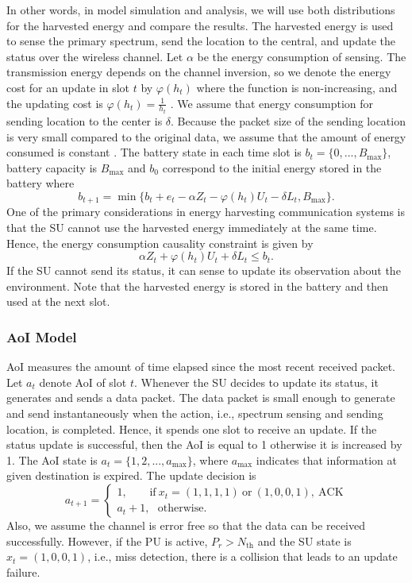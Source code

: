 \documentclass[journal]{IEEEtran}
\begin{document}
		In other words, in model simulation and analysis, we will use both distributions for the harvested energy and compare the results. The harvested energy is used to sense the primary spectrum, send the location to the central, and update the status over the wireless channel. Let $\alpha$ be the energy consumption of sensing. The transmission energy depends on the channel inversion, so we denote the energy cost for an update in slot $t$ by $\varphi ({h_t})$ where the function  is non-increasing, and the updating cost is $\varphi ({h_t}) = \frac{1}{{{h_t}}}$ \cite{Joint_24}. We assume that energy consumption for sending location to the center is $\delta$. Because the packet size of the sending location is very small compared to the original data, we assume that the amount of energy consumed is constant \cite{Joint_24}. The battery state in each time slot is $b_t = \{0,..., B_{\text{max}}\}$, battery capacity is $B_{\text{max}}$ and $b_0$ correspond to the initial energy stored in the battery where
		\begin{equation}
			b_{t + 1} = \min \{ {b_t} + {e_t} - \alpha {Z_t} - \varphi ({h_t}){U_t} - \delta {L_t},{B_{\max }}\}.
		\end{equation}
		One of the primary considerations in energy harvesting communication systems is that the SU cannot use the harvested energy immediately at the same time. Hence, the energy consumption causality constraint is given by
		\begin{equation}
			\alpha {Z_t} + \varphi ({h_t}){U_t} + \delta {L_t} \le {b_t}.
		\end{equation}
		If the SU cannot send its status, it can sense to update its observation about the environment. Note that the harvested energy is stored in the battery and then used at the next slot.
	\subsubsection{AoI Model}
		AoI measures the amount of time elapsed since the most recent received packet. Let $a_t$ denote AoI of slot $t$. Whenever the SU decides to update its status, it generates and sends a data packet. The data packet is small enough to generate and send instantaneously when the action, i.e., spectrum sensing and sending location, is completed. Hence, it spends one slot to receive an update. If the status update is successful, then the AoI is equal to 1 otherwise it is increased by 1. The AoI state is $a_t = \{1,2,..., a_{\text{max}}\}$, where $a_{\text{max}}$ indicates that information at given destination is expired. The update decision is
		\begin{equation}
			{a_{t + 1}} = \left\{ \begin{array}{l}
			1,~~~~~~~~~\text{if}~{x_t} = (1,1,1,1)~\text{or}~(1,0,0,1),~\text{ACK}\\
			{a_t} + 1,~~~\text{otherwise}.
			\end{array} \right.
		\end{equation}
		Also, we assume the channel is error free so that the data can be received successfully. However, if the PU is active, $P_r>N_{\text{th}}$ and the SU state is $x_t = (1,0,0,1)$, i.e., miss detection, there is a collision that leads to an update failure.
\end{document}
